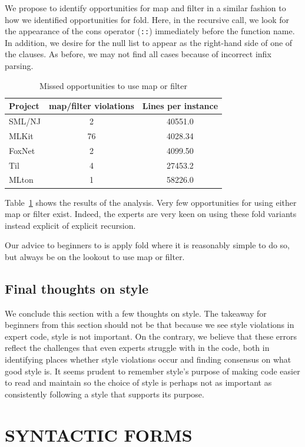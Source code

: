 \documentclass[12pt,abstracton]{scrartcl}
\begin{document}
We propose to identify opportunities for map and filter
in a similar fashion to how we identified opportunities for fold.
Here, in the recursive call, we look for the appearance of the cons operator (\texttt{::})
immediately before the function name. In addition, we desire for the
null list to appear as the right-hand side of one of the clauses.
As before, we may not find all cases because of incorrect infix parsing.

\begin{table}[h!]
\centering
\begin{tabular}{|l||c|c|}\hline
Project & map/filter violations & Lines per instance \\ \hline\hline
SML/NJ & 2 & 40551.0 \\
MLKit & 76 & 4028.34 \\
FoxNet & 2 & 4099.50 \\
Til & 4 & 27453.2 \\
MLton & 1 & 58226.0 \\ \hline
\end{tabular}
\caption{Missed opportunities to use map or filter}
\label{table:mapfilter}
\end{table}

Table~\ref{table:mapfilter} shows the results of the analysis.
Very few opportunities for using either map or filter
exist. Indeed, the experts are very keen on using these fold variants
instead explicit of explicit recursion.

Our advice to beginners to is apply fold where it is reasonably
simple to do so, but always be on the lookout to use map or filter.
\subsection{Final thoughts on style}\label{subsec:stylethoughts}
We conclude this section with a few thoughts on style.
The takeaway for beginners from this section should not be
that because we see style violations in expert code,
style is not important. On the contrary, we believe that
these errors reflect the challenges that even experts
struggle with in the code, both in identifying places
whether style violations occur and finding consensus on
what good style is. It seems prudent to
remember style's purpose of making code easier to read
and maintain so the choice of style is perhaps not as important as consistently following
a style that supports its purpose.
\section{SYNTACTIC FORMS}\label{sec:syntax}
\end{document}
